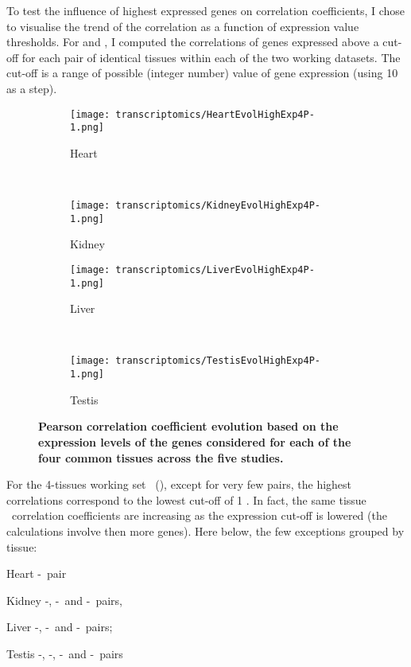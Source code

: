 To test the influence of highest expressed genes on correlation coefficients,
I chose to visualise the trend of the correlation
as a function of expression value thresholds.
For  and ,
I computed the correlations of genes expressed above a cut-off
for each pair of identical tissues within each of the two working datasets.
The cut-off is a range of possible (integer number) value of gene expression
(using 10 as a step).

\begin{sidewaysfigure}[!htpb]
    \centering
    \begin{subfigure}[b]{0.48\textwidth}\centering
        \texttt{[image: transcriptomics/HeartEvolHighExp4P-1.png]}
        \caption{Heart}\label{fig:CorHighExpHeart4T}
    \end{subfigure}%
~%
    \begin{subfigure}[b]{0.48\textwidth}\centering
        \texttt{[image: transcriptomics/KidneyEvolHighExp4P-1.png]}
        \caption{Kidney}\label{fig:CorHighExpKidney4T}
    \end{subfigure}

    \begin{subfigure}[b]{0.48\textwidth}\centering
        \texttt{[image: transcriptomics/LiverEvolHighExp4P-1.png]}
        \caption{Liver}\label{fig:CorHighExpLiver4T}
    \end{subfigure}%
~%
    \begin{subfigure}[b]{0.48\textwidth}\centering
        \texttt{[image: transcriptomics/TestisEvolHighExp4P-1.png]}
        \caption{Testis}\label{fig:CorHighExpTestis4T}
    \end{subfigure}
    \caption[Pearson correlation coefficient evolution based on the expression
    levels of the genes considered for each of the 4 common tissues]{%
\label{fig:CorHighExp4T}\textbf{Pearson correlation coefficient evolution
    based on the expression levels of the genes considered for each of the four
    common tissues across the five studies.}}
\end{sidewaysfigure}

For the 4-tissues working set \setOne\ (),
except for very few pairs, the highest correlations correspond to
the lowest cut-off of 1 \FPKM\@.
In fact, the same tissue \trep\ correlation coefficients
are increasing as the expression cut-off is lowered
(the calculations involve then more genes).
Here below, the few exceptions grouped by tissue:
\begin{eqlist}
\item[Heart] \uhlen{}-\gtex\ pair
\item[Kidney] \uhlen{}-\gtex, \castle{}-\uhlen\ and \castle{}-\gtex\ pairs,
\item[Liver]  \vt{}-\ibm, \ibm{}-\uhlen\ and \ibm{}-\uhlen\ pairs;
\item[Testis] \ibm{}-\uhlen, \vt{}-\gtex, \vt{}-\uhlen\ and \uhlen{}-\gtex\ pairs
\end{eqlist}

